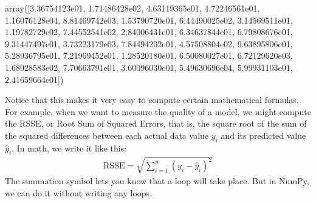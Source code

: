 \documentclass[letterpaper,10pt,english]{jupyterBook}
\begin{document}
\begin{sphinxVerbatim}[commandchars=\\\{\}]
array([3.36754123e\PYGZhy{}01, 1.71486428e\PYGZhy{}02, 4.63119365e\PYGZhy{}01, 4.72246561e\PYGZhy{}01,
       1.16076128e\PYGZhy{}04, 8.81469742e\PYGZhy{}03, 1.53790720e\PYGZhy{}01, 6.44490025e\PYGZhy{}02,
       3.14569511e\PYGZhy{}01, 1.19782729e\PYGZhy{}02, 7.44552541e\PYGZhy{}02, 2.84006431e\PYGZhy{}01,
       6.34637844e\PYGZhy{}01, 6.79808676e\PYGZhy{}01, 9.31447497e\PYGZhy{}01, 3.73223179e\PYGZhy{}03,
       7.84494202e\PYGZhy{}01, 4.57508804e\PYGZhy{}02, 9.63895806e\PYGZhy{}01, 5.28936795e\PYGZhy{}01,
       7.21969452e\PYGZhy{}01, 1.28520180e\PYGZhy{}01, 6.50080027e\PYGZhy{}01, 6.72129620e\PYGZhy{}03,
       1.68928583e\PYGZhy{}02, 7.70663791e\PYGZhy{}01, 3.60096030e\PYGZhy{}01, 5.49630696e\PYGZhy{}04,
       5.99931103e\PYGZhy{}01, 2.41659664e\PYGZhy{}01])
\end{sphinxVerbatim}

\sphinxAtStartPar
Notice that this makes it very easy to compute certain mathematical formulas.  For example, when we want to measure the quality of a model, we might compute the RSSE, or Root Sum of Squared Errors, that is, the square root of the sum of the squared differences between each actual data value \(y_i\) and its predicted value \(\hat y_i\).  In math, we write it like this:
\begin{equation*}
\begin{split} \text{RSSE} = \sqrt{\sum_{i=1}^n (y_i-\hat y_i)^2} \end{split}
\end{equation*}
\sphinxAtStartPar
The summation symbol lets you know that a loop will take place.  But in NumPy, we can do it without writing any loops.

\begin{sphinxVerbatim}[commandchars=\\\{\}]
      \PYG{p}{[}      \PYG{p}{]}    
   \PYG{p}{[}      \PYG{p}{]}    
           
\end{sphinxVerbatim}
\end{document}
